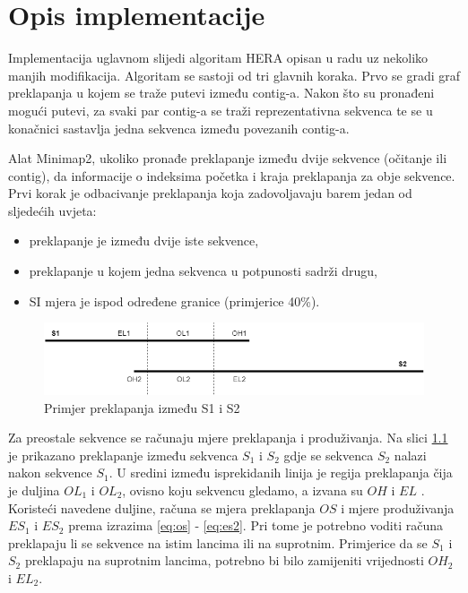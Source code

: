 \chapter{Opis implementacije}
Implementacija uglavnom slijedi algoritam HERA  opisan u radu \citep{Du345983} uz nekoliko manjih modifikacija. Algoritam se sastoji od tri glavnih koraka. Prvo se gradi graf preklapanja u kojem se traže putevi između contig-a. Nakon što su pronađeni mogući putevi, za svaki par contig-a se traži reprezentativna sekvenca te se u konačnici sastavlja jedna sekvenca između povezanih contig-a.

Alat Minimap2, ukoliko pronađe preklapanje između dvije sekvence (očitanje ili contig), da informacije o indeksima početka i kraja preklapanja za obje sekvence. Prvi korak je odbacivanje preklapanja koja zadovoljavaju barem jedan od sljedećih uvjeta:

\begin{itemize}
\item preklapanje je između dvije iste sekvence,
\item preklapanje u kojem jedna sekvenca u potpunosti sadrži drugu,
\item SI  mjera je ispod određene granice (primjerice 40\%).
\end{itemize}

\begin{figure}[htb]
\centering
\includegraphics[width=\textwidth]{img/overlap.png}
\caption{Primjer preklapanja između S1 i S2}
\label{fig:overlap}
\end{figure}

Za preostale sekvence se računaju mjere preklapanja i produživanja. Na slici \ref{fig:overlap} je prikazano preklapanje između sekvenca $S_1$ i $S_2$ gdje se sekvenca $S_2$ nalazi nakon sekvence $S_1$. U sredini između isprekidanih linija je regija preklapanja čija je duljina $OL_1$ i $OL_2$, ovisno koju sekvencu gledamo, a izvana su $OH$  i $EL$ . Koristeći navedene duljine, računa se mjera preklapanja $OS$ i mjere produživanja $ES_1$ i $ES_2$ prema izrazima \ref{eq:os} - \ref{eq:es2}. Pri tome je potrebno voditi računa preklapaju li se sekvence na istim lancima ili na suprotnim. Primjerice da se $S_1$ i $S_2$ preklapaju na suprotnim lancima, potrebno bi bilo zamijeniti vrijednosti $OH_2$ i $EL_2$.

